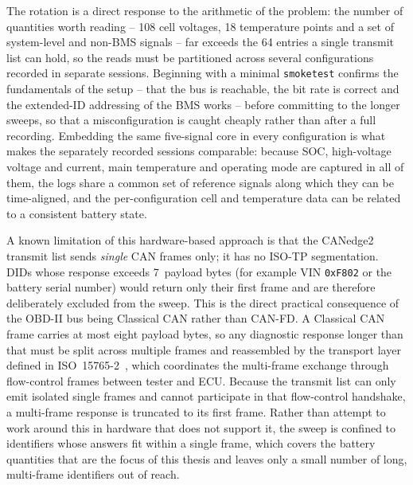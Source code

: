 \documentclass[11pt,a4paper,oneside,parskip=half]{scrreprt}
\providecommand{\hex}{}\renewcommand{\hex}[1]{\texttt{0x#1}}
\begin{document}
The rotation is a direct response to the arithmetic of the problem: the number of quantities worth reading -- 108 cell voltages, 18 temperature points and a set of system-level and non-BMS signals -- far exceeds the 64 entries a single transmit list can hold, so the reads must be partitioned across several configurations recorded in separate sessions. Beginning with a minimal \texttt{smoketest} confirms the fundamentals of the setup -- that the bus is reachable, the bit rate is correct and the extended-ID addressing of the BMS works -- before committing to the longer sweeps, so that a misconfiguration is caught cheaply rather than after a full recording. Embedding the same five-signal core in every configuration is what makes the separately recorded sessions comparable: because SOC, high-voltage voltage and current, main temperature and operating mode are captured in all of them, the logs share a common set of reference signals along which they can be time-aligned, and the per-configuration cell and temperature data can be related to a consistent battery state.

A known limitation of this hardware-based approach is that the CANedge2 transmit list sends \emph{single} CAN frames only; it has no ISO-TP segmentation. DIDs whose response exceeds 7~payload bytes (for example VIN \hex{F802} or the battery serial number) would return only their first frame and are therefore deliberately excluded from the sweep. This is the direct practical consequence of the OBD-II bus being Classical CAN rather than CAN-FD. A Classical CAN frame carries at most eight payload bytes, so any diagnostic response longer than that must be split across multiple frames and reassembled by the transport layer defined in ISO~15765-2~\cite{iso15765}, which coordinates the multi-frame exchange through flow-control frames between tester and ECU. Because the transmit list can only emit isolated single frames and cannot participate in that flow-control handshake, a multi-frame response is truncated to its first frame. Rather than attempt to work around this in hardware that does not support it, the sweep is confined to identifiers whose answers fit within a single frame, which covers the battery quantities that are the focus of this thesis and leaves only a small number of long, multi-frame identifiers out of reach.


\end{document}
